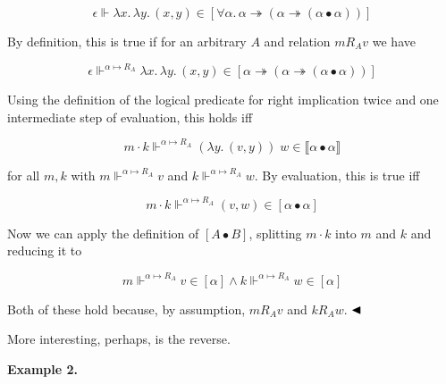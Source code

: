 \documentclass[10pt,a4paper]{amsart}
\begin{document}
\par  \quad  \[\epsilon\Vdash\lambda x.\,\lambda y.\,(x,y)\in[\forall\alpha.\,\alpha\twoheadrightarrow(\alpha\twoheadrightarrow(\alpha\bullet\alpha))]\]\quad  \quad  
  
By definition, this is true if for an arbitrary $A$ and relation $m\mathrel{R_{A}}v$ we have\par
  
\par  \quad  \[\epsilon\Vdash^{\alpha\mapsto R_{A}}\lambda x.\,\lambda y.\,(x,y)\in[\alpha\twoheadrightarrow(\alpha\twoheadrightarrow(\alpha\bullet\alpha))]\]\quad  \quad  
  
Using the definition of the logical predicate for right implication twice and one intermediate step of evaluation, this holds iff\par
  
\par  \quad  \[m\cdot k\Vdash^{\alpha\mapsto R_{A}}(\lambda y.\,(v,y))\;w\in\llbracket\alpha\bullet\alpha\rrbracket\]\quad  \quad  
  
for all $m,k$ with $m\Vdash^{\alpha\mapsto R_{A}}v$ and $k\Vdash^{\alpha\mapsto R_{A}}w$. By evaluation, this is true iff\par
  
\par  \quad  \[m\cdot k\Vdash^{\alpha\mapsto R_{A}}(v,w)\in[\alpha\bullet\alpha]\]\quad  \quad  
  
Now we can apply the definition of $[A\bullet B]$, splitting $m\cdot k$ into $m$ and $k$ and reducing it to\par
  
\par  \quad  \[m\Vdash^{\alpha\mapsto R_{A}}v\in[\alpha]\land k\Vdash^{\alpha\mapsto R_{A}}w\in[\alpha]\]\quad  \quad  
  
Both of these hold because, by assumption, $m\mathrel{R_{A}}v$ and $k\mathrel{R_{A}}w$. $\hfill\blacktriangleleft$\par
 
 
 
More interesting, perhaps, is the reverse.\par
 
 
 
\par\medskip\noindent\textbf{Example 2.}\par
 
\end{document}
